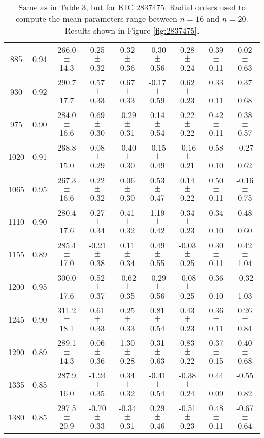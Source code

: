 \documentclass[twocolumn]{aastex61}%
\begin{document}
\begin{table*}[ht]
\begin{tabular}{ccc|ccccc|c}
885 & 0.94 & 266.0 $\pm$ 14.3 & 0.25 $\pm$ 0.32 & 0.32 $\pm$ 0.36 & -0.30 $\pm$ 0.56 & 0.28 $\pm$ 0.24 & 0.39 $\pm$ 0.11 & 0.02 $\pm$ 0.63\\
930 & 0.92 & 290.7 $\pm$ 17.7 & 0.57 $\pm$ 0.33 & 0.67 $\pm$ 0.33 & -0.17 $\pm$ 0.59 & 0.62 $\pm$ 0.23 & 0.33 $\pm$ 0.11 & 0.37 $\pm$ 0.68\\
975 & 0.90 & 284.0 $\pm$ 16.6 & 0.69 $\pm$ 0.30 & -0.29 $\pm$ 0.31 & 0.14 $\pm$ 0.54 & 0.22 $\pm$ 0.22 & 0.42 $\pm$ 0.11 & 0.38 $\pm$ 0.57\\
1020 & 0.91 & 268.8 $\pm$ 15.0 & 0.08 $\pm$ 0.29 & -0.40 $\pm$ 0.30 & -0.15 $\pm$ 0.49 & -0.16 $\pm$ 0.21 & 0.58 $\pm$ 0.10 & -0.27 $\pm$ 0.62\\
1065 & 0.95 & 267.3 $\pm$ 16.6 & 0.22 $\pm$ 0.32 & 0.06 $\pm$ 0.30 & 0.53 $\pm$ 0.47 & 0.14 $\pm$ 0.22 & 0.50 $\pm$ 0.11 & -0.16 $\pm$ 0.75\\
1110 & 0.90 & 280.4 $\pm$ 17.6 & 0.27 $\pm$ 0.34 & 0.41 $\pm$ 0.32 & 1.19 $\pm$ 0.42 & 0.34 $\pm$ 0.23 & 0.34 $\pm$ 0.10 & 0.48 $\pm$ 0.60\\
1155 & 0.89 & 285.4 $\pm$ 17.0 & -0.21 $\pm$ 0.38 & 0.11 $\pm$ 0.34 & 0.49 $\pm$ 0.55 & -0.03 $\pm$ 0.25 & 0.30 $\pm$ 0.11 & 0.42 $\pm$ 1.04\\
1200 & 0.95 & 300.0 $\pm$ 17.6 & 0.52 $\pm$ 0.37 & -0.62 $\pm$ 0.35 & -0.29 $\pm$ 0.56 & -0.08 $\pm$ 0.25 & 0.36 $\pm$ 0.10 & -0.32 $\pm$ 1.03\\
1245 & 0.90 & 311.2 $\pm$ 18.1 & 0.61 $\pm$ 0.33 & 0.25 $\pm$ 0.33 & 0.81 $\pm$ 0.54 & 0.43 $\pm$ 0.23 & 0.36 $\pm$ 0.11 & 0.26 $\pm$ 0.84\\
1290 & 0.89 & 289.1 $\pm$ 14.3 & 0.06 $\pm$ 0.36 & 1.30 $\pm$ 0.28 & 0.31 $\pm$ 0.63 & 0.83 $\pm$ 0.22 & 0.37 $\pm$ 0.15 & 0.40 $\pm$ 0.68\\
1335 & 0.85 & 287.9 $\pm$ 16.0 & -1.24 $\pm$ 0.35 & 0.34 $\pm$ 0.32 & -0.41 $\pm$ 0.54 & -0.38 $\pm$ 0.24 & 0.44 $\pm$ 0.09 & -0.55 $\pm$ 0.82\\
1380 & 0.85 & 297.5 $\pm$ 20.9 & -0.70 $\pm$ 0.33 & -0.34 $\pm$ 0.31 & 0.29 $\pm$ 0.46 & -0.51 $\pm$ 0.23 & 0.48 $\pm$ 0.11 & -0.67 $\pm$ 0.64\\
\end{tabular}
\caption{Same as in Table 3, but for KIC 2837475. Radial orders used to compute the mean parameters range between $n=16$ and $n=20$. Results shown in Figure \ref{fig:2837475}.}\label{tab:2837475}
\end{table*}
\end{document}
